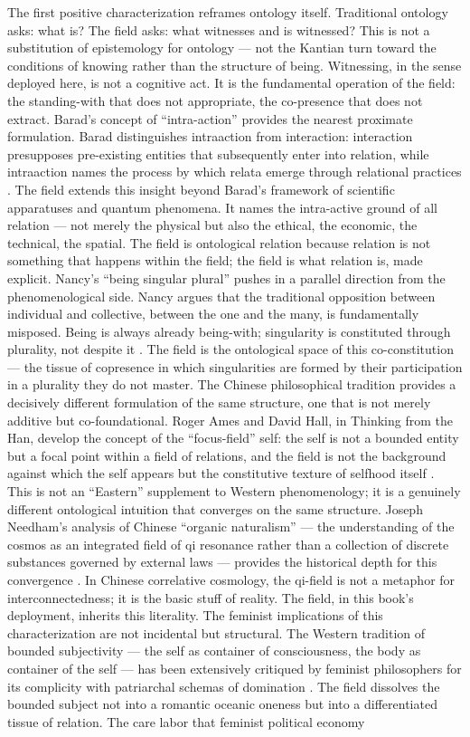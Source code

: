 The first positive characterization reframes ontology itself. Traditional ontology asks: what is? The field asks: what witnesses and is witnessed? This is not a substitution of epistemology for ontology — not the Kantian turn toward the conditions of knowing rather than the structure of being. Witnessing, in the sense deployed here, is not a cognitive act. It is the fundamental operation of the field: the standing-with that does not appropriate, the co-presence that does not extract. Barad’s concept of “intra-action” provides the nearest proximate formulation. Barad distinguishes intraaction from interaction: interaction presupposes pre-existing entities that subsequently enter into relation, while intraaction names the process by which relata emerge through relational practices \cite{barad_2007}. The field extends this insight beyond Barad’s framework of scientific apparatuses and quantum phenomena. It names the intra-active ground of all relation — not merely the physical but also the ethical, the economic, the technical, the spatial. The field is ontological relation because relation is not something that happens within the field; the field is what relation is, made explicit. Nancy’s “being singular plural” pushes in a parallel direction from the phenomenological side. Nancy argues that the traditional opposition between individual and collective, between the one and the many, is fundamentally misposed. Being is always already being-with; singularity is constituted through plurality, not despite it \cite{nancy_1996}. The field is the ontological space of this co-constitution — the tissue of copresence in which singularities are formed by their participation in a plurality they do not master. The Chinese philosophical tradition provides a decisively different formulation of the same structure, one that is not merely additive but co-foundational. Roger Ames and David Hall, in Thinking from the Han, develop the concept of the “focus-field” self: the self is not a bounded entity but a focal point within a field of relations, and the field is not the background against which the self appears but the constitutive texture of selfhood itself \cite{ames_hall_1998}. This is not an “Eastern” supplement to Western phenomenology; it is a genuinely different ontological intuition that converges on the same structure. Joseph Needham’s analysis of Chinese “organic naturalism” — the understanding of the cosmos as an integrated field of qi resonance rather than a collection of discrete substances governed by external laws — provides the historical depth for this convergence \cite{needham_1956}. In Chinese correlative cosmology, the qi-field is not a metaphor for interconnectedness; it is the basic stuff of reality. The field, in this book’s deployment, inherits this literality. The feminist implications of this characterization are not incidental but structural. The Western tradition of bounded subjectivity — the self as container of consciousness, the body as container of the self — has been extensively critiqued by feminist philosophers for its complicity with patriarchal schemas of domination \cite{braidotti_2013}. The field dissolves the bounded subject not into a romantic oceanic oneness but into a differentiated tissue of relation. The care labor that feminist political economy 